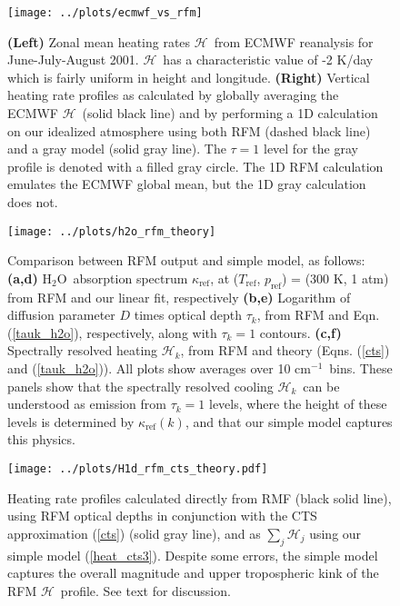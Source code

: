 \documentclass{ametsoc}
\newcommand{\eqnref}[1]{(\ref{#1})}
\newcommand{\cminverse}{\ensuremath{\mathrm{cm^{-1}}}}
\newcommand{\htwo}{\ensuremath{\mathrm{H_2O}}}
\newcommand{\ch}{\ensuremath{\mathcal{H}}}
\newcommand{\chk}{\ensuremath{\ch_k}}
\newcommand{\tauk}{\ensuremath{\tau_k}}
\newcommand{\kapparef}{\ensuremath{\kappa_{\mathrm{ref}}}}
\newcommand{\Tref}{\ensuremath{T_{\mathrm{ref}}}}
\newcommand{\pref}{\ensuremath{p_{\mathrm{ref}}}}
\begin{document}
%
\begin{figure}[h]
	\begin{center}
			\texttt{[image: ../plots/ecmwf\_vs\_rfm]}
			\caption{\textbf{(Left)}  Zonal mean heating rates \ch\ from ECMWF reanalysis for June-July-August 2001. \ch\ has a characteristic value of -2 K/day which is fairly uniform in height and longitude. 
						\textbf{(Right)} Vertical heating rate profiles as calculated by globally averaging the ECMWF \ch\ (solid black line) and by performing a 1D calculation on our idealized atmosphere using both RFM (dashed black line)  and  a gray model (solid gray line). The $\tau=1$ level for the gray profile is denoted with a filled gray circle. The 1D RFM calculation emulates the ECMWF global mean, but the 1D gray calculation does not.
			\label{ecmwf_vs_rfm}
			}
	 \end{center}
\end{figure}

\begin{figure}[h]
	\begin{center}
			\texttt{[image: ../plots/h2o\_rfm\_theory]}
		\caption{Comparison between RFM output and simple model, as follows:
					 \textbf{(a,d)} \htwo\ absorption spectrum \kapparef, at (\Tref, \pref) = (300 K, 1 atm) from RFM and our linear fit, respectively
					 \textbf{(b,e)} Logarithm of diffusion parameter $D$ times optical depth $\tauk$, from RFM and Eqn. \eqnref{tauk_h2o}, respectively, along with $\tauk=1$ contours.
					 \textbf{(c,f)}  Spectrally resolved heating $\ch_k$, from RFM and theory (Eqns. \eqnref{cts} and \eqnref{tauk_h2o}). 
					 All plots show averages over 10 \cminverse\ bins. These panels show that the spectrally resolved cooling \chk\ can be understood as emission from $\tauk=1$ levels, where the height of these levels is determined by $\kapparef(k)$, and that  our simple model captures this physics.
		\label{h2o_rfm_theory}
		}
	\end{center}
\end{figure}


\begin{figure}[h!]
	\begin{center}
			\texttt{[image: ../plots/H1d\_rfm\_cts\_theory.pdf]}
		\caption{ Heating rate profiles calculated directly from RMF (black solid line), using RFM optical depths in conjunction with the CTS approximation \eqnref{cts} (solid gray line), and as  $\sum_j\ch_j$ using our simple model \eqnref{heat_cts3}.  Despite some errors, the simple model captures  the overall magnitude and upper tropospheric kink of the RFM \ch\ profile. See text for discussion.
	  \label{H1d_rfm_cts_theory}
		}
	\end{center}
\end{figure}
\end{document}
